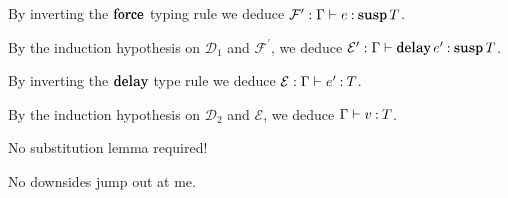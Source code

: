 \documentclass[11pt,letterpaper]{article}
\DeclareMathOperator{\DelayOp}{\mathqd{delay}}
\newcommand{\delay}{\DelayOp}
\DeclareMathOperator{\ForceOp}{\mathqd{force}}
\newcommand{\force}{\ForceOp}
\DeclareMathOperator{\SuspOp}{\mathqd{susp}}
\newcommand{\susp}{\SuspOp}
\begin{document}
\begin{enumerate}
\begin{description}
        By inverting the $\force$ typing rule
        we deduce $\mathcal{F}^\prime : \Gamma \proves e \hastype \susp T$.

        By the induction hypothesis on $\mathcal{D}_1$ and
        $\mathcal{F}^\prime$,
        we deduce
        $\mathcal{E}^\prime : \Gamma \proves \delay e^\prime \hastype \susp T$.

        By inverting the $\delay$ type rule
        we deduce $\mathcal{E} : \Gamma \vdash e^\prime \mathbin{:} T$.

        By the induction hypothesis on $\mathcal{D}_2$ and $\mathcal{E}$,
        we deduce $\Gamma \vdash v \mathbin{:} T$.
    \end{description}
    No substitution lemma required!

    No downsides jump out at me.
\end{enumerate}
\end{document}
